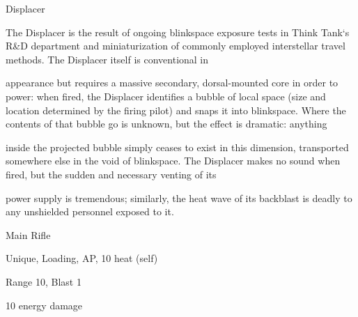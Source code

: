 Displacer

The Displacer is the result of ongoing blinkspace exposure tests in Think Tank‘s R\&D department and
miniaturization of commonly employed interstellar travel methods. The Displacer itself is conventional in

appearance but requires a massive secondary, dorsal-mounted core in order to power: when fired, the
Displacer identifies a bubble of local space (size and location determined by the firing pilot) and snaps it
into blinkspace. Where the contents of that bubble go is unknown, but the effect is dramatic: anything

inside the projected bubble simply ceases to exist in this dimension, transported somewhere else in the
void of blinkspace. The Displacer makes no sound when fired, but the sudden and necessary venting of its




power supply is tremendous; similarly, the heat wave of its backblast is deadly to any unshielded personnel
exposed to it.

Main Rifle

Unique, Loading, AP, 10 heat (self)

Range 10, Blast 1

10 energy damage
